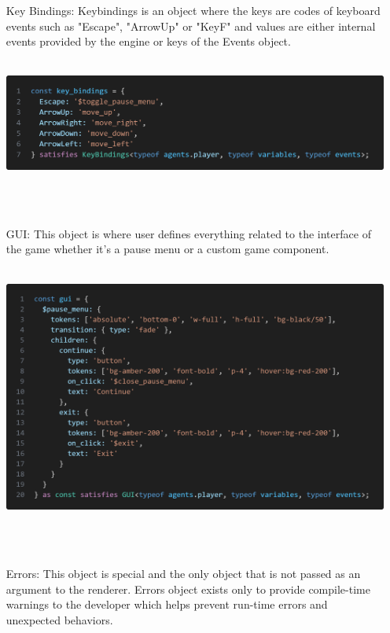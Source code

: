 \documentclass{article}
\begin{document}
\begin{itemize}
    \item[Key Bindings:] Keybindings is an object where the keys are codes of keyboard events such as "Escape", "ArrowUp" or "KeyF" and values are either internal events provided by the engine or keys of the Events object.\\\\
    \begin{minipage}{\linewidth}
        \centering
        \includegraphics[width=1\textwidth]{key bindings.png}
    \end{minipage}\\\\
    
    \item[GUI:] This object is where user defines everything related to the interface of the game whether it's a pause menu or a custom game component.\\\\
    \begin{minipage}{\linewidth}
        \centering
        \includegraphics[width=1\textwidth]{gui.png}
    \end{minipage}\\\\
    
    \item[Errors:] This object is special and the only object that is not passed as an argument to the renderer. Errors object exists only to provide compile-time warnings to the developer which helps prevent run-time errors and unexpected behaviors.
\end{itemize}
\end{document}
